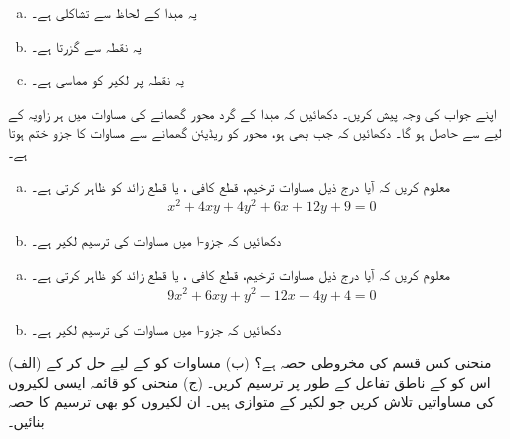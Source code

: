 \begin{enumerate}[a.]
\item
یہ مبدا کے لحاظ سے تشاکلی ہے۔
\item
یہ نقطہ  سے گزرتا ہے۔
\item
یہ نقطہ  پر لکیر  کو مماسی ہے۔
\end{enumerate} 
اپنے جواب کی وجہ پیش کریں۔
دکھائیں کہ مبدا کے گرد محور  گھمانے کی مساوات  میں ہر زاویہ  کے لیے  سے  حاصل ہو گا۔
دکھائیں کہ جب بھی  ہو، محور کو  ریڈیئن گھمانے سے مساوات  کا  جزو ختم ہوتا ہے۔
\begin{enumerate}[a.]
\item
معلوم کریں کہ آیا درج ذیل مساوات ترخیم، قطع کافی ، یا قطع زائد کو ظاہر کرتی ہے۔
\begin{align*}
x^2+4xy+4y^2+6x+12y+9=0
\end{align*}
\item
دکھائیں کہ جزو-ا میں مساوات کی ترسیم لکیر  ہے۔
\end{enumerate}
\begin{enumerate}[a.]
\item
معلوم کریں کہ آیا درج ذیل مساوات ترخیم، قطع کافی ، یا قطع زائد کو ظاہر کرتی ہے۔
\begin{align*}
9x^2+6xy+y^2-12x-4y+4=0
\end{align*}
\item
دکھائیں کہ جزو-ا میں مساوات کی ترسیم لکیر  ہے۔
\end{enumerate}
(الف) منحنی  کس قسم کی مخروطی حصہ ہے؟ (ب) مساوات  کو  کے لیے حل کر کے اس کو  کے ناطق تفاعل کے طور پر ترسیم کریں۔ (ج) منحنی کو  قائمہ ایسی لکیروں کی مساواتیں تلاش کریں جو      لکیر  کے متوازی ہیں۔ ان لکیروں کو بھی ترسیم کا حصہ بنائیں۔
